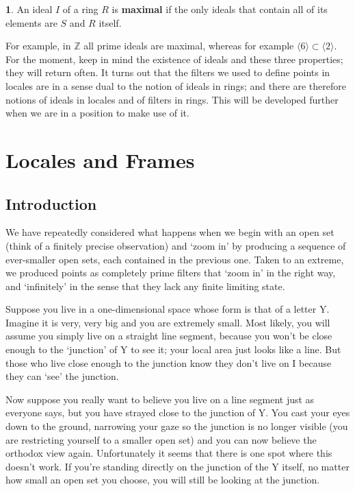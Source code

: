 \documentclass[oneside,english]{amsbook}
\numberwithin{section}{chapter}
\theoremstyle{plain}
\theoremstyle{definition}
\newtheorem{defn}[thm]{\protect\definitionname}
\providecommand{\definitionname}{Definition}
\begin{document}
\begin{defn}
	An ideal $I$ of a ring $R$ is \textbf{maximal} if the only ideals that contain all of its elements are $S$ and $R$ itself.
\end{defn}

For example, in $\mathbb{Z}$ all prime ideals are maximal, whereas for example $\langle 6\rangle\subset \langle 2\rangle$. For the moment, keep in mind the existence of ideals and these three properties; they will return often. It turns out that the filters we used to define points in locales are in a sense dual to the notion of ideals in rings; and there are therefore notions of ideals in locales and of filters in rings. This will be developed further when we are in a position to make use of it.


\chapter{Locales and Frames}

\section{Introduction}

We have repeatedly considered what happens when we begin with an open set (think of a finitely precise observation) and `zoom in' by producing a sequence of ever-smaller open sets, each contained in the previous one. Taken to an extreme, we produced points as completely prime filters that `zoom in' in the right way, and `infinitely' in the sense that they lack any finite limiting state.

Suppose you live in a one-dimensional space whose form is that of a letter Y. Imagine it is very, very big and you are extremely small. Most likely, you will assume you simply live on a straight line segment, because you won't be close enough to the `junction' of Y to see it; your local area just looks like a line. But those who live close enough to the junction know they don't live on I because they can `see' the junction.

Now suppose you really want to believe you live on a line segment just as everyone says, but you have strayed close to the junction of Y. You cast your eyes down to the ground, narrowing your gaze so the junction is no longer visible (you are restricting yourself to a smaller open set) and you can now believe the orthodox view again. Unfortunately it seems that there is one spot where this doesn't work. If you're standing directly on the junction of the Y itself, no matter how small an open set you choose, you will still be looking at the junction.
\end{document}

